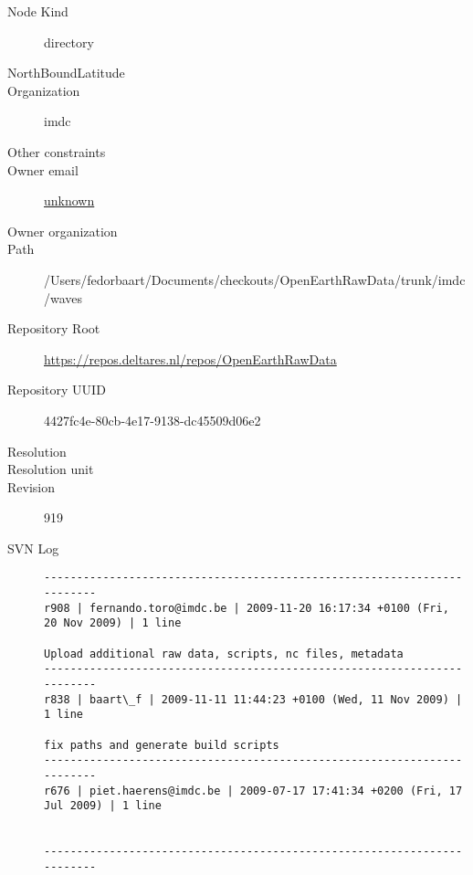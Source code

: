 \documentclass[9]{report}
\begin{document}
\begin{description}
  \item[Node Kind] directory
  \item[NorthBoundLatitude] 
  \item[Organization] imdc
  \item[Other constraints] 
  \item[Owner email] \href{mailto:unknown}{unknown}
  \item[Owner organization] 
  \item[Path] /Users/fedorbaart/Documents/checkouts/OpenEarthRawData/trunk/imdc/waves
  \item[Repository Root] \href{https://repos.deltares.nl/repos/OpenEarthRawData}{https://repos.deltares.nl/repos/OpenEarthRawData}
  \item[Repository UUID] 4427fc4e-80cb-4e17-9138-dc45509d06e2
  \item[Resolution] 
  \item[Resolution unit] 
  \item[Revision] 919
  \item[SVN Log] \begin{verbatim}
------------------------------------------------------------------------
r908 | fernando.toro@imdc.be | 2009-11-20 16:17:34 +0100 (Fri, 20 Nov 2009) | 1 line

Upload additional raw data, scripts, nc files, metadata
------------------------------------------------------------------------
r838 | baart\_f | 2009-11-11 11:44:23 +0100 (Wed, 11 Nov 2009) | 1 line

fix paths and generate build scripts
------------------------------------------------------------------------
r676 | piet.haerens@imdc.be | 2009-07-17 17:41:34 +0200 (Fri, 17 Jul 2009) | 1 line


------------------------------------------------------------------------


\end{verbatim}
\end{description}
\end{document}
